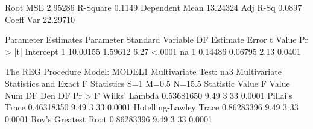 \documentclass{article}
\begin{document}
\begin{Woutput}
Root MSE              2.95286    R-Square     0.1149
Dependent Mean       13.24324    Adj R-Sq     0.0897
Coeff Var            22.29710

                        Parameter Estimates
                     Parameter       Standard
Variable     DF       Estimate          Error    t Value    Pr > |t|
Intercept     1       10.00155        1.59612       6.27      <.0001
na            1        0.14486        0.06795       2.13      0.0401

The REG Procedure
Model: MODEL1
Multivariate Test: na3
                Multivariate Statistics and Exact F Statistics
                            S=1    M=0.5    N=15.5
Statistic                        Value    F Value    Num DF    Den DF    Pr > F
Wilks' Lambda               0.53681650       9.49         3        33    0.0001
Pillai's Trace              0.46318350       9.49         3        33    0.0001
Hotelling-Lawley Trace      0.86283396       9.49         3        33    0.0001
Roy's Greatest Root         0.86283396       9.49         3        33    0.0001
\end{Woutput}
\end{document}
